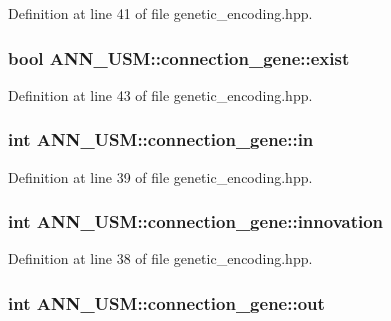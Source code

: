 Definition at line 41 of file genetic\-\_\-encoding.\-hpp.

\hypertarget{class_a_n_n___u_s_m_1_1connection__gene_afe8be67cb9aaffbe9015729fbcfe84f9}{
\subsubsection[{exist}]{\setlength{\rightskip}{0pt plus 5cm}bool A\-N\-N\-\_\-\-U\-S\-M\-::connection\-\_\-gene\-::exist}}\label{class_a_n_n___u_s_m_1_1connection__gene_afe8be67cb9aaffbe9015729fbcfe84f9}


Definition at line 43 of file genetic\-\_\-encoding.\-hpp.

\hypertarget{class_a_n_n___u_s_m_1_1connection__gene_a5100dadf9e141335a47230003303f2d2}{
\subsubsection[{in}]{\setlength{\rightskip}{0pt plus 5cm}int A\-N\-N\-\_\-\-U\-S\-M\-::connection\-\_\-gene\-::in}}\label{class_a_n_n___u_s_m_1_1connection__gene_a5100dadf9e141335a47230003303f2d2}


Definition at line 39 of file genetic\-\_\-encoding.\-hpp.

\hypertarget{class_a_n_n___u_s_m_1_1connection__gene_acd19e4cadbac4ef5aa4ae0b7aa3ae5c2}{
\subsubsection[{innovation}]{\setlength{\rightskip}{0pt plus 5cm}int A\-N\-N\-\_\-\-U\-S\-M\-::connection\-\_\-gene\-::innovation}}\label{class_a_n_n___u_s_m_1_1connection__gene_acd19e4cadbac4ef5aa4ae0b7aa3ae5c2}


Definition at line 38 of file genetic\-\_\-encoding.\-hpp.

\hypertarget{class_a_n_n___u_s_m_1_1connection__gene_abc6a5dafbfa3133efc876c8f0f762dd6}{
\subsubsection[{out}]{\setlength{\rightskip}{0pt plus 5cm}int A\-N\-N\-\_\-\-U\-S\-M\-::connection\-\_\-gene\-::out}}\label{class_a_n_n___u_s_m_1_1connection__gene_abc6a5dafbfa3133efc876c8f0f762dd6}


